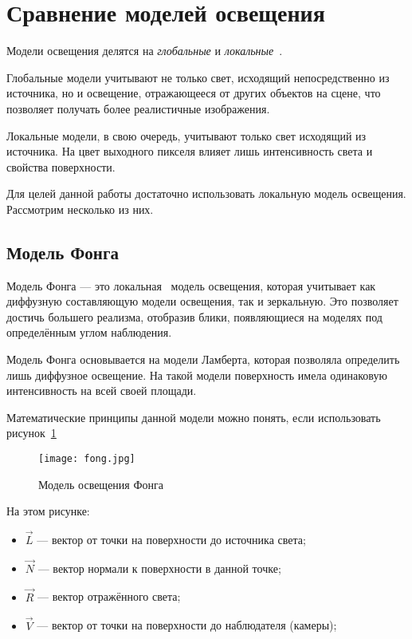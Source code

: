 \section{Сравнение моделей освещения}

Модели освещения делятся на \emph{глобальные} и \emph{локальные}~\cite{CGPaP}.

Глобальные модели учитывают не только свет, исходящий непосредственно из источника, но и освещение, отражающееся от других объектов на сцене, что позволяет получать более реалистичные изображения.

Локальные модели, в свою очередь, учитывают только свет исходящий из источника. На цвет выходного пикселя влияет лишь интенсивность света и свойства поверхности.

Для целей данной работы достаточно использовать локальную модель освещения. Рассмотрим несколько из них.

\subsection{Модель Фонга}

Модель Фонга --- это локальная~\cite{CGPaP} модель освещения, которая учитывает как диффузную составляющую модели освещения, так и зеркальную. Это позволяет достичь большего реализма, отобразив блики, появляющиеся на моделях под определённым углом наблюдения.

Модель Фонга основывается на модели Ламберта, которая позволяла определить лишь диффузное освещение. На такой модели поверхность имела одинаковую интенсивность на всей своей площади.

Математические принципы данной модели можно понять, если использовать рисунок~\ref{fig:fong}

\begin{figure}[h]
    \centering
    \texttt{[image: fong.jpg]}
    \caption{Модель освещения Фонга}
    \label{fig:fong}
\end{figure}

На этом рисунке:
\begin{itemize}
    \item $\vec{L}$ --- вектор от точки на поверхности до источника света;
    \item $\vec{N}$ --- вектор нормали к поверхности в данной точке; 
    \item $\vec{R}$ --- вектор отражённого света;
    \item $\vec{V}$ --- вектор от точки на поверхности до наблюдателя (камеры);
\end{itemize}

